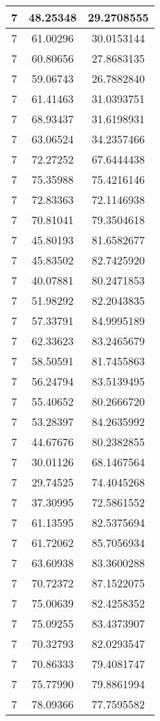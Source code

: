 \documentclass[
]{book}
\begin{document}
\begin{tabular}{c|c|c}
\hline
7 & 48.25348 & 29.2708555\\
\hline
7 & 61.00296 & 30.0153144\\
\hline
7 & 60.80656 & 27.8683135\\
\hline
7 & 59.06743 & 26.7882840\\
\hline
7 & 61.41463 & 31.0393751\\
\hline
7 & 68.93437 & 31.6198931\\
\hline
7 & 63.06524 & 34.2357466\\
\hline
7 & 72.27252 & 67.6444438\\
\hline
7 & 75.35988 & 75.4216146\\
\hline
7 & 72.83363 & 72.1146938\\
\hline
7 & 70.81041 & 79.3504618\\
\hline
7 & 45.80193 & 81.6582677\\
\hline
7 & 45.83502 & 82.7425920\\
\hline
7 & 40.07881 & 80.2471853\\
\hline
7 & 51.98292 & 82.2043835\\
\hline
7 & 57.33791 & 84.9995189\\
\hline
7 & 62.33623 & 83.2465679\\
\hline
7 & 58.50591 & 81.7455863\\
\hline
7 & 56.24794 & 83.5139495\\
\hline
7 & 55.40652 & 80.2666720\\
\hline
7 & 53.28397 & 84.2635992\\
\hline
7 & 44.67676 & 80.2382855\\
\hline
7 & 30.01126 & 68.1467564\\
\hline
7 & 29.74525 & 74.4045268\\
\hline
7 & 37.30995 & 72.5861552\\
\hline
7 & 61.13595 & 82.5375694\\
\hline
7 & 61.72062 & 85.7056934\\
\hline
7 & 63.60938 & 83.3600288\\
\hline
7 & 70.72372 & 87.1522075\\
\hline
7 & 75.00639 & 82.4258352\\
\hline
7 & 75.09255 & 83.4373907\\
\hline
7 & 70.32793 & 82.0293547\\
\hline
7 & 70.86333 & 79.4081747\\
\hline
7 & 75.77990 & 79.8861994\\
\hline
7 & 78.09366 & 77.7595582\\

\end{tabular}
\end{document}
